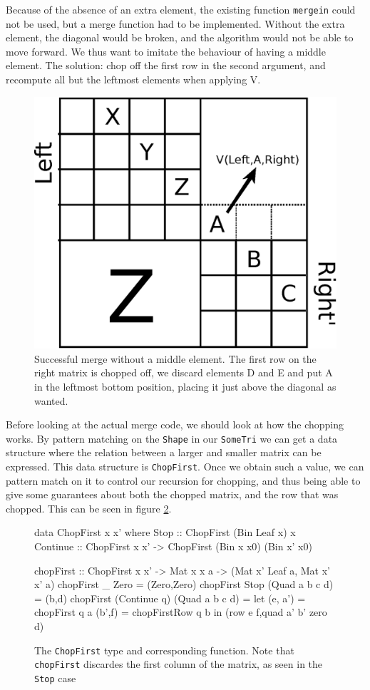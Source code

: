 \documentclass[a4paper,12pt,twosided]{report}
\begin{document}
Because of the absence of an extra element, the existing function
\texttt{mergein} could not be used, but a merge function had to be implemented.
Without the extra element, the diagonal would be broken, and the algorithm would
not be able to move forward. We thus want to imitate the behaviour of having a
middle element.  The solution: chop off the first row in the second argument,
and recompute all but the leftmost elements when applying V. \label{chopsection}

\begin{figure}
\centering
\includegraphics[width=.5\textwidth]{merge-with-chopping.eps}
\caption{\label{chopmerge}Successful merge without a middle element. The first
row on the right matrix is chopped off, we discard elements D and E and put A in
the leftmost bottom position, placing it just above the diagonal as wanted.}
\end{figure}

Before looking at the actual merge code, we should look at how the chopping
works. By pattern matching on the \texttt{Shape} in our \texttt{SomeTri} we can
get a data structure where the relation between a larger and smaller matrix can
be expressed. This data structure is \texttt{ChopFirst}. Once we obtain such a
value, we can pattern match on it to control our recursion for chopping, and
thus being able to give some guarantees about both the chopped matrix, and the
row that was chopped. This can be seen in figure \ref{chopfirst}.

\begin{figure}[H]
\begin{code}
data ChopFirst x x' where
  Stop :: ChopFirst (Bin Leaf x) x
  Continue :: ChopFirst x x' -> ChopFirst (Bin x x0) (Bin x' x0)

chopFirst :: ChopFirst x x' -> Mat x x a  
                            -> (Mat x' Leaf a, Mat x' x' a)
chopFirst _ Zero = (Zero,Zero)
chopFirst Stop (Quad a b c d) = (b,d)
chopFirst (Continue q) (Quad a b c d) =
  let  (e, a') = chopFirst q a
       (b',f)  = chopFirstRow q b
  in (row e f,quad a' b' zero d)
\end{code}
\caption{\label{chopfirst} The \texttt{ChopFirst} type and corresponding
function. Note that \texttt{chopFirst} discardes the first column of the matrix, as seen
in the \texttt{Stop} case}
\end{figure}
\end{document}
